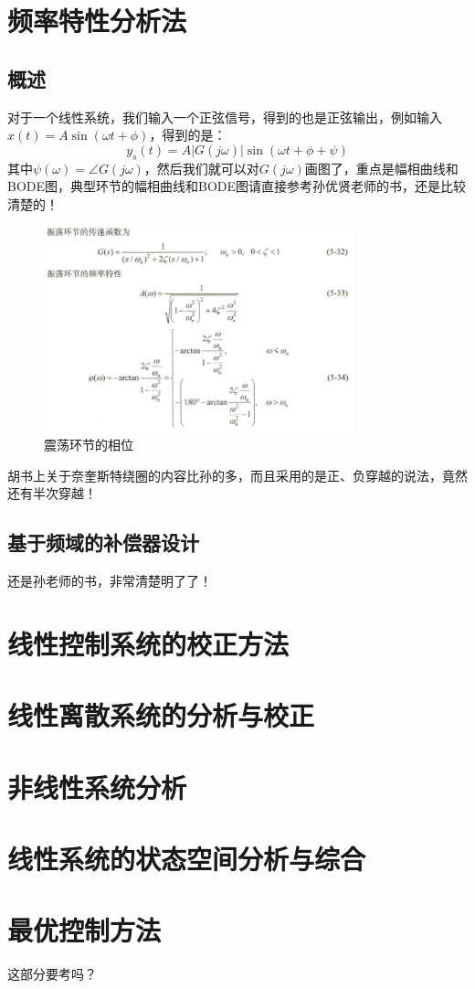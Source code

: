 \documentclass[lang=cn,10pt]{elegantbook}
\begin{document}
\chapter{频率特性分析法}

\section{概述}
对于一个线性系统，我们输入一个正弦信号，得到的也是正弦输出，例如输入$x(t) = A\sin{(\omega t + \phi)}$，得到的是：
\[y_s(t) = A|G(j\omega)|\sin(\omega t + \phi +\psi)\]
其中$\psi(\omega)=\angle G(j\omega)$，然后我们就可以对$G(j\omega)$画图了，重点是幅相曲线和BODE图，典型环节的幅相曲线和BODE图请直接参考孙优贤老师的书，还是比较清楚的！

\begin{figure}[htbp]
  \centering
  \includegraphics[width=0.8\textwidth]{image/phase_two.png}
  \caption{震荡环节的相位} \label{fig:phase_two}
\end{figure}

\textcolor[rgb]{0.75, 0.5, 0.25}{胡书上关于奈奎斯特绕圈的内容比孙的多，而且采用的是正、负穿越的说法，竟然还有半次穿越！}



\section{基于频域的补偿器设计}
还是孙老师的书，非常清楚明了了！

\chapter{线性控制系统的校正方法}

\chapter{线性离散系统的分析与校正}

\chapter{非线性系统分析}

\chapter{线性系统的状态空间分析与综合}

\chapter{最优控制方法}

这部分要考吗？
\end{document}
